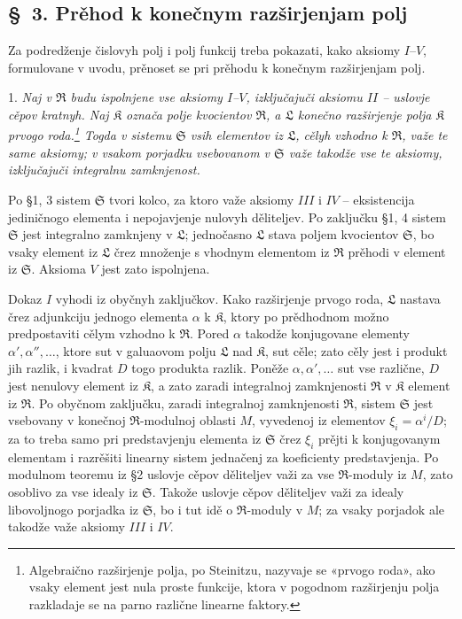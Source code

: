 \documentclass[11pt]{article}
\providecommand{\mR}{\mathfrak{R}}
\providecommand{\mK}{\mathfrak{K}}
\providecommand{\mL}{\mathfrak{L}}
\providecommand{\mS}{\mathfrak{S}}
\begin{document}
\setcounter{footnote}{12}

\subsection*{\S~3. Prěhod k konečnym razširjenjam polj}

Za podredženje čislovyh polj i polj funkcij treba pokazati, kako aksiomy $I$--$V$, formulovane v uvodu, prěnoset se pri prěhodu k konečnym razširjenjam polj.

1. {\itshape Naj v $\mR$ budu ispolnjene vse aksiomy $I$--$V$, izključajuči aksiomu $II$ -- uslovje cěpov kratnyh. Naj $\mK$ označa polje kvocientov $\mR$, a $\mL$ konečno razširjenje polja $\mK$ prvogo roda.\footnote{Algebraično razširjenje polja, po Steinitzu, nazyvaje se «prvogo roda», ako vsaky element jest nula proste funkcije, ktora v pogodnom razširjenju polja razkladaje se na parno različne linearne faktory.} Togda v sistemu $\mS$ vsih elementov iz $\mL$, cělyh vzhodno k $\mR$, važe te same aksiomy; v vsakom porjadku vsebovanom v $\mS$ važe takodže vse te aksiomy, izključajuči integralnu zamknjenost.}

Po §1, 3 sistem $\mS$ tvori kolco, za ktoro važe aksiomy $III$ i $IV$ -- eksistencija jediničnogo elementa i nepojavjenje nulovyh děliteljev. Po zaključku §1, 4 sistem $\mS$ jest integralno zamknjeny v $\mL$; jednočasno $\mL$ stava poljem kvocientov $\mS$, bo vsaky element iz $\mL$ črez množenje s vhodnym elementom iz $\mR$ prěhodi v element iz $\mS$. Aksioma $V$ jest zato ispolnjena.

Dokaz $I$ vyhodi iz obyčnyh zaključkov. Kako razširjenje prvogo roda, $\mL$ nastava črez adjunkciju jednogo elementa $\alpha$ k $\mK$, ktory po prědhodnom možno predpostaviti cělym vzhodno k $\mR$. Pored $\alpha$ takodže konjugovane elementy $\alpha',\alpha'',\ldots$, ktore sut v galuaovom polju $\mL$ nad $\mK$, sut cěle; zato cěly jest i produkt jih razlik, i kvadrat $D$ togo produkta razlik. Poněže $\alpha,\alpha',\ldots$ sut vse različne, $D$ jest nenulovy element iz $\mK$, a zato zaradi integralnoj zamknjenosti $\mR$ v $\mK$ element iz $\mR$. Po obyčnom zaključku, zaradi integralnoj zamknjenosti $\mR$, sistem $\mS$ jest vsebovany v konečnoj $\mR$-modulnoj oblasti $M$, vyvedenoj iz elementov $\xi_i=\alpha^i/D$; za to treba samo pri predstavjenju elementa iz $\mS$ črez $\xi_i$ prějti k konjugovanym elementam i razrěšiti linearny sistem jednačenj za koeficienty predstavjenja. Po modulnom teoremu iz §2 uslovje cěpov děliteljev važi za vse $\mR$-moduly iz $M$, zato osoblivo za vse idealy iz $\mS$. Takože uslovje cěpov děliteljev važi za idealy libovoljnogo porjadka iz $\mS$, bo i tut idě o $\mR$-moduly v $M$; za vsaky porjadok ale takodže važe aksiomy $III$ i $IV$.
\end{document}
